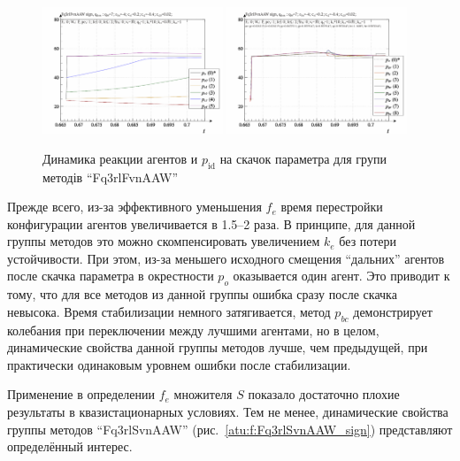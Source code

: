 \begin{figure}[htb!]
  \begin{center}
    \includegraphics[width=0.48\textwidth]{p/sign/qls-p_t_pi_m_Fq3rlFvnAAW_sign.png}
    \hfill
    \includegraphics[width=0.48\textwidth]{p/sign/qls-p_t_p_m_Fq3rlFvnAAW_sign.png}
  \end{center}
  \caption{Динамика реакции агентов и $p_\mathrm{id}$ на скачок параметра для групи методів ``Fq3rlFvnAAW''}
  \label{atu:f:Fq3rlFvnAAW_sign}
\end{figure}

Прежде всего, из-за эффективного уменьшения $f_e$
время перестройки конфигурации агентов увеличивается в 1.5--2 раза.
В принципе, для данной группы методов это можно скомпенсировать увеличением $k_e$
без потери устойчивости.
При этом, из-за меньшего исходного смещения ``дальних'' агентов
после скачка параметра в окрестности $p_o$ оказывается один агент.
Это приводит к тому, что для все методов из данной группы
ошибка сразу после скачка невысока. Время стабилизации
немного затягивается, метод $p_{bc}$ демонстрирует колебания
при переключении между лучшими агентами, но в целом,
динамические свойства данной группы методов лучше, чем предыдущей,
при практически одинаковым уровнем ошибки после стабилизации.

Применение в определении $f_e$ множителя $S$
показало достаточно плохие результаты в квазистационарных
условиях. Тем не менее, динамические свойства
группы методов ``Fq3rlSvnAAW''
(рис.~\ref{atu:f:Fq3rlSvnAAW_sign})
представляют определённый интерес.

